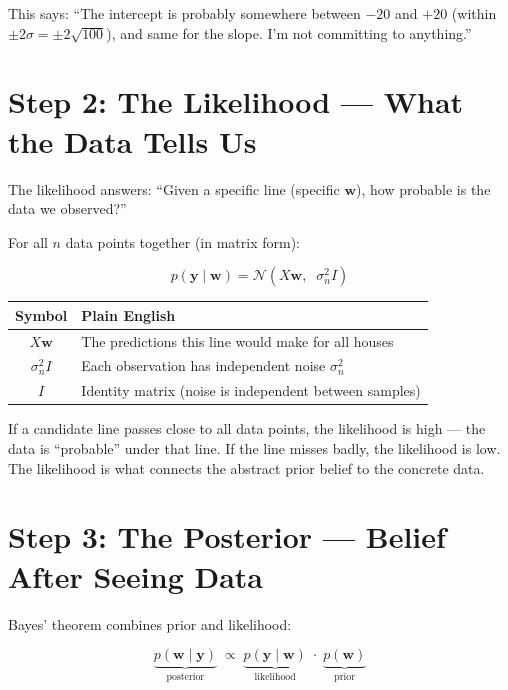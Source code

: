 \documentclass[11pt, a4paper]{article}
\newcommand{\gut}[1]{\begin{tcolorbox}[colback=lightyellow, colframe=orange!50, title=Gut feeling]#1\end{tcolorbox}}
\begin{document}
This says: ``The intercept is probably somewhere between $-20$ and $+20$ (within $\pm 2\sigma = \pm 2\sqrt{100}$), and same for the slope. I'm not committing to anything.''


\section*{\color{secblue}Step 2: The Likelihood --- What the Data Tells Us}

The likelihood answers: ``Given a specific line (specific $\mathbf{w}$), how probable is the data we observed?''

For all $n$ data points together (in matrix form):

\begin{equation}
p(\mathbf{y} \mid \mathbf{w}) = \mathcal{N}(X\mathbf{w}, \;\; \sigma_n^2 I)
\tag{B-5}
\end{equation}

\begin{center}
\begin{tabular}{cl}
\toprule
\textbf{Symbol} & \textbf{Plain English} \\
\midrule
$X\mathbf{w}$ & The predictions this line would make for all houses \\
$\sigma_n^2 I$ & Each observation has independent noise $\sigma_n^2$ \\
$I$ & Identity matrix (noise is independent between samples) \\
\bottomrule
\end{tabular}
\end{center}

\gut{
If a candidate line passes close to all data points, the likelihood is high --- the data is ``probable'' under that line. If the line misses badly, the likelihood is low. The likelihood is what connects the abstract prior belief to the concrete data.
}


\section*{\color{secblue}Step 3: The Posterior --- Belief After Seeing Data}

Bayes' theorem combines prior and likelihood:

\begin{equation}
\underbrace{p(\mathbf{w} \mid \mathbf{y})}_{\text{posterior}} \;\propto\; \underbrace{p(\mathbf{y} \mid \mathbf{w})}_{\text{likelihood}} \;\cdot\; \underbrace{p(\mathbf{w})}_{\text{prior}}
\tag{B-6}
\end{equation}
\end{document}
